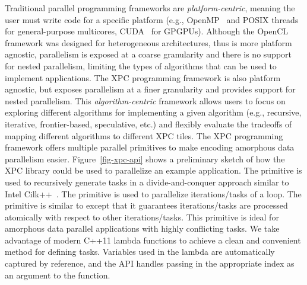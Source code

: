 Traditional parallel programming frameworks are \emph{platform-centric},
meaning the user must write code for a specific platform (e.g.,
OpenMP~\cite{openmp3-spec2008} and POSIX threads for general-purpose
multicores, CUDA~\cite{nvidia-kepler-wpaper2012} for GPGPUs). Although
the OpenCL~\cite{opencl1-spec2011} framework was designed for
heterogeneous architectures, thus is more platform agnostic, parallelism
is exposed at a coarse granularity and there is no support for nested
parallelism, limiting the types of algorithms that can be used to
implement applications.
The XPC programming framework is also platform agnostic, but exposes
parallelism at a finer granularity and provides support for nested
parallelism. This \emph{algorithm-centric} framework allows users to
focus on exploring different algorithms for implementing a given
algorithm (e.g., recursive, iterative, frontier-based, speculative,
etc.) and flexibly evaluate the tradeoffs of mapping different algorithms
to different XPC tiles.
The XPC programming framework offers multiple parallel primitives to make
encoding amorphous data parallelism easier. Figure~\ref{fig-xpc-api}
shows a preliminary sketch of how the XPC library could be used to
parallelize an example application. The  primitive is used to
recursively generate tasks in a divide-and-conquer approach similar to
Intel Cilk++~\cite{cilk-spec2010}. The  primitive is
used to parallelize iterations/tasks of a loop. The 
primitive is similar to  except that it guarantees
iterations/tasks are processed atomically with respect to other
iterations/tasks. This primitive is ideal for amorphous data parallel
applications with highly conflicting tasks. We take advantage of modern
C++11 lambda functions to achieve a clean and convenient method for
defining tasks. Variables used in the lambda are automatically captured
by reference, and the API handles passing in the appropriate index as an
argument to the function.

\begin{figure}
  \begin{minipage}[b]{0.44\tw}
    
  \end{minipage}%
  \hfill%
  \begin{minipage}[b]{0.54\tw}
    
  \end{minipage}
\end{figure}


